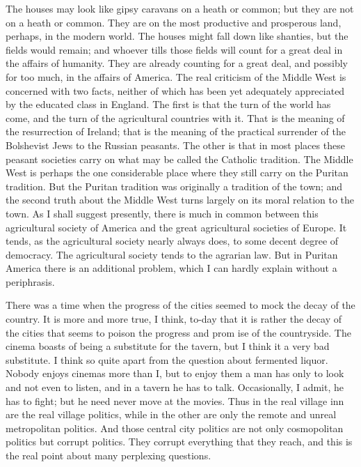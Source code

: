 \documentclass{book}
\begin{document}
The houses may look like gipsy caravans on a heath or common; but they are not on a heath or common. They are on the most productive and prosperous land, perhaps, in the modern world. The houses might fall down like shanties, but the fields would remain; and whoever tills those fields will count for a great deal in the affairs of humanity. They are already counting for a great deal, and possibly for too much, in the affairs of America. The real criticism of the Middle West is concerned with two facts, neither of which has been yet adequately appreciated by the educated class in England. The first is that the turn of the world has come, and the turn of the agricultural countries with it. That is the meaning of the resurrection of Ireland; that is the meaning of the practical surrender of the Bolshevist Jews to the Russian peasants. The other is that in most places these peasant societies carry on what may be called the Catholic tradition. The Middle West is perhaps the one considerable place where they still carry on the Puritan tradition. But the Puritan tradition was originally a tradition of the town; and the second truth about the Middle West turns largely on its moral relation to the town. As I shall suggest presently, there is much in common between this agricultural society of America and the great agricultural societies of Europe. It tends, as the agricultural society nearly always does, to some decent degree of democracy. The agricultural society tends to the agrarian law. But in Puritan America there is an additional problem, which I can hardly explain without a periphrasis.

There was a time when the progress of the cities seemed to mock the decay of the country. It is more and more true, I think, to-day that it is rather the decay of the cities that seems to poison the progress and prom ise of the countryside. The cinema boasts of being a substitute for the tavern, but I think it a very bad substitute. I think so quite apart from the question about fermented liquor. Nobody enjoys cinemas more than I, but to enjoy them a man has only to look and not even to listen, and in a tavern he has to talk. Occasionally, I admit, he has to fight; but he need never move at the movies. Thus in the real village inn are the real village politics, while in the other are only the remote and unreal metropolitan politics. And those central city politics are not only cosmopolitan politics but corrupt politics. They corrupt everything that they reach, and this is the real point about many perplexing questions.
\end{document}
